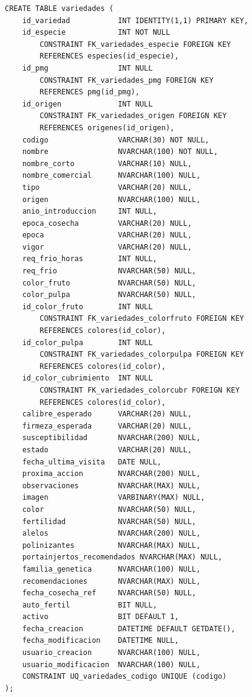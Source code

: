 \documentclass[12pt,a4paper,twoside]{report}
\begin{document}
\begin{lstlisting}[style=sqlstyle, caption={variedades}]
CREATE TABLE variedades (
    id_variedad           INT IDENTITY(1,1) PRIMARY KEY,
    id_especie            INT NOT NULL
        CONSTRAINT FK_variedades_especie FOREIGN KEY
        REFERENCES especies(id_especie),
    id_pmg                INT NULL
        CONSTRAINT FK_variedades_pmg FOREIGN KEY
        REFERENCES pmg(id_pmg),
    id_origen             INT NULL
        CONSTRAINT FK_variedades_origen FOREIGN KEY
        REFERENCES origenes(id_origen),
    codigo                VARCHAR(30) NOT NULL,
    nombre                NVARCHAR(100) NOT NULL,
    nombre_corto          VARCHAR(10) NULL,
    nombre_comercial      NVARCHAR(100) NULL,
    tipo                  VARCHAR(20) NULL,
    origen                NVARCHAR(100) NULL,
    anio_introduccion     INT NULL,
    epoca_cosecha         VARCHAR(20) NULL,
    epoca                 VARCHAR(20) NULL,
    vigor                 VARCHAR(20) NULL,
    req_frio_horas        INT NULL,
    req_frio              NVARCHAR(50) NULL,
    color_fruto           NVARCHAR(50) NULL,
    color_pulpa           NVARCHAR(50) NULL,
    id_color_fruto        INT NULL
        CONSTRAINT FK_variedades_colorfruto FOREIGN KEY
        REFERENCES colores(id_color),
    id_color_pulpa        INT NULL
        CONSTRAINT FK_variedades_colorpulpa FOREIGN KEY
        REFERENCES colores(id_color),
    id_color_cubrimiento  INT NULL
        CONSTRAINT FK_variedades_colorcubr FOREIGN KEY
        REFERENCES colores(id_color),
    calibre_esperado      VARCHAR(20) NULL,
    firmeza_esperada      VARCHAR(20) NULL,
    susceptibilidad       NVARCHAR(200) NULL,
    estado                VARCHAR(20) NULL,
    fecha_ultima_visita   DATE NULL,
    proxima_accion        NVARCHAR(200) NULL,
    observaciones         NVARCHAR(MAX) NULL,
    imagen                VARBINARY(MAX) NULL,
    color                 NVARCHAR(50) NULL,
    fertilidad            NVARCHAR(50) NULL,
    alelos                NVARCHAR(200) NULL,
    polinizantes          NVARCHAR(MAX) NULL,
    portainjertos_recomendados NVARCHAR(MAX) NULL,
    familia_genetica      NVARCHAR(100) NULL,
    recomendaciones       NVARCHAR(MAX) NULL,
    fecha_cosecha_ref     NVARCHAR(50) NULL,
    auto_fertil           BIT NULL,
    activo                BIT DEFAULT 1,
    fecha_creacion        DATETIME DEFAULT GETDATE(),
    fecha_modificacion    DATETIME NULL,
    usuario_creacion      NVARCHAR(100) NULL,
    usuario_modificacion  NVARCHAR(100) NULL,
    CONSTRAINT UQ_variedades_codigo UNIQUE (codigo)
);
\end{lstlisting}
\end{document}
